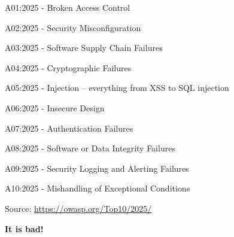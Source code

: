 \documentclass[Screen16to9,17pt]{foils}
\begin{document}
\begin{list2}
\item A01:2025 - Broken Access Control
\item A02:2025 - Security Misconfiguration
\item A03:2025 - Software Supply Chain Failures
\item A04:2025 - Cryptographic Failures
\item A05:2025 - Injection -- everything from XSS to SQL injection
\item A06:2025 - Insecure Design
\item A07:2025 - Authentication Failures
\item A08:2025 - Software or Data Integrity Failures
\item A09:2025 - Security Logging and Alerting Failures
\item A10:2025 - Mishandling of Exceptional Conditions
\end{list2}
Source: \url{https://owasp.org/Top10/2025/}

\centerline{\bf It is bad!}


\end{document}
